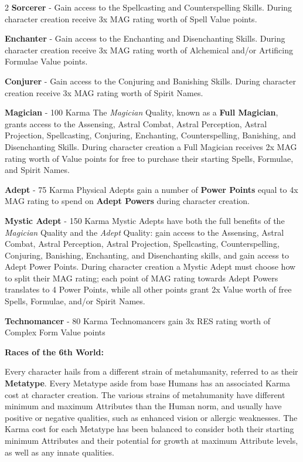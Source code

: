 \documentclass[
  oneside]{article}
\begin{document}
\begin{multicols}{2}
\textbf{Sorcerer} - Gain access to the
Spellcasting and Counterspelling Skills. During
character creation receive 3x MAG rating worth of
Spell Value points.

\textbf{Enchanter} - Gain access to the Enchanting
and Disenchanting Skills. During character
creation receive 3x MAG rating worth of Alchemical
and/or Artificing Formulae Value points.

\textbf{Conjurer} - Gain access to the Conjuring
and Banishing Skills. During character creation
receive 3x MAG rating worth of Spirit Names.

\textbf{Magician} - 100 Karma The \emph{Magician}
Quality, known as a \textbf{Full Magician}, grants
access to the Assensing, Astral Combat, Astral
Perception, Astral Projection, Spellcasting,
Conjuring, Enchanting, Counterspelling, Banishing,
and Disenchanting Skills. During character
creation a Full Magician receives 2x MAG rating
worth of Value points for free to purchase their
starting Spells, Formulae, and Spirit Names.

\textbf{Adept} - 75 Karma Physical Adepts gain a
number of \textbf{Power Points} equal to 4x MAG
rating to spend on \textbf{Adept Powers} during
character creation.

\textbf{Mystic Adept} - 150 Karma Mystic Adepts
have both the full benefits of the \emph{Magician}
Quality and the \emph{Adept} Quality: gain access
to the Assensing, Astral Combat, Astral
Perception, Astral Projection, Spellcasting,
Counterspelling, Conjuring, Banishing, Enchanting,
and Disenchanting skills, and gain access to Adept
Power Points. During character creation a Mystic
Adept must choose how to split their MAG rating;
each point of MAG rating towards Adept Powers
translates to 4 Power Points, while all other
points grant 2x Value worth of free Spells,
Formulae, and/or Spirit Names.

\textbf{Technomancer} - 80 Karma Technomancers
gain 3x RES rating worth of Complex Form Value
points

\textbf{Races of the 6th World:}

Every character hails from a different strain of
metahumanity, referred to as their
\textbf{Metatype}. Every Metatype aside from base
Humans has an associated Karma cost at character
creation. The various strains of metahumanity have
different minimum and maximum Attributes than the
Human norm, and usually have positive or negative
qualities, such as enhanced vision or allergic
weaknesses. The Karma cost for each Metatype has
been balanced to consider both their starting
minimum Attributes and their potential for growth
at maximum Attribute levels, as well as any innate
qualities.

\end{multicols}
\end{document}
